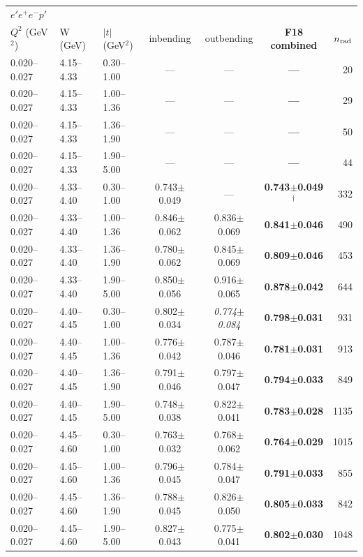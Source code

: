 \begin{tabular}{lllcccr}\toprule
\multicolumn{7}{l}{$e'e^+e^-p'$}\\
$Q^2$ (GeV$^2$) & W (GeV) & $|t|$ (GeV$^2$) & inbending & outbending & \textbf{F18 combined} & $n_{\rm rad}$ \\\midrule
0.020--0.027 & 4.15--4.33 & 0.30--1.00 & --- & --- & \textbf{---} & 20 \\
0.020--0.027 & 4.15--4.33 & 1.00--1.36 & --- & --- & \textbf{---} & 29 \\
0.020--0.027 & 4.15--4.33 & 1.36--1.90 & --- & --- & \textbf{---} & 50 \\
0.020--0.027 & 4.15--4.33 & 1.90--5.00 & --- & --- & \textbf{---} & 44 \\
0.020--0.027 & 4.33--4.40 & 0.30--1.00 & 0.743$\pm$0.049 & --- & \textbf{0.743$\pm$0.049$^\dagger$} & 332 \\
0.020--0.027 & 4.33--4.40 & 1.00--1.36 & 0.846$\pm$0.062 & 0.836$\pm$0.069 & \textbf{0.841$\pm$0.046} & 490 \\
0.020--0.027 & 4.33--4.40 & 1.36--1.90 & 0.780$\pm$0.062 & 0.845$\pm$0.069 & \textbf{0.809$\pm$0.046} & 453 \\
0.020--0.027 & 4.33--4.40 & 1.90--5.00 & 0.850$\pm$0.056 & 0.916$\pm$0.065 & \textbf{0.878$\pm$0.042} & 644 \\
0.020--0.027 & 4.40--4.45 & 0.30--1.00 & 0.802$\pm$0.034 & \textit{0.774$\pm$0.084} & \textbf{0.798$\pm$0.031} & 931 \\
0.020--0.027 & 4.40--4.45 & 1.00--1.36 & 0.776$\pm$0.042 & 0.787$\pm$0.046 & \textbf{0.781$\pm$0.031} & 913 \\
0.020--0.027 & 4.40--4.45 & 1.36--1.90 & 0.791$\pm$0.046 & 0.797$\pm$0.047 & \textbf{0.794$\pm$0.033} & 849 \\
0.020--0.027 & 4.40--4.45 & 1.90--5.00 & 0.748$\pm$0.038 & 0.822$\pm$0.041 & \textbf{0.783$\pm$0.028} & 1135 \\
0.020--0.027 & 4.45--4.60 & 0.30--1.00 & 0.763$\pm$0.032 & 0.768$\pm$0.062 & \textbf{0.764$\pm$0.029} & 1015 \\
0.020--0.027 & 4.45--4.60 & 1.00--1.36 & 0.796$\pm$0.045 & 0.784$\pm$0.047 & \textbf{0.791$\pm$0.033} & 855 \\
0.020--0.027 & 4.45--4.60 & 1.36--1.90 & 0.788$\pm$0.045 & 0.826$\pm$0.050 & \textbf{0.805$\pm$0.033} & 842 \\
0.020--0.027 & 4.45--4.60 & 1.90--5.00 & 0.827$\pm$0.043 & 0.775$\pm$0.041 & \textbf{0.802$\pm$0.030} & 1048 \\
\bottomrule\end{tabular}

